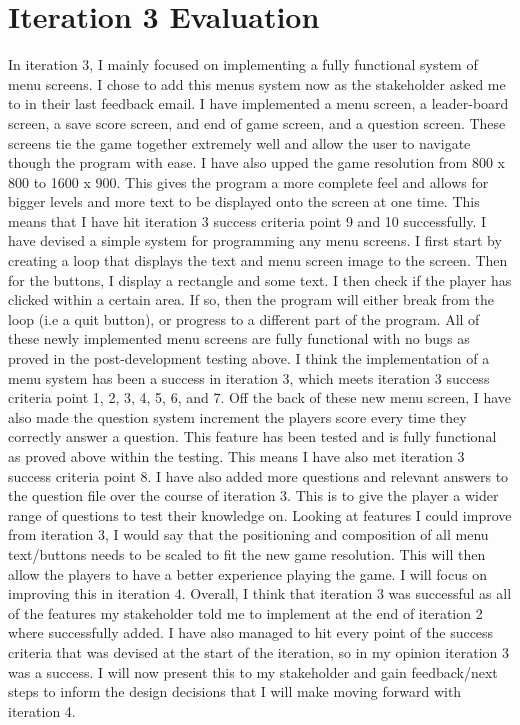 \documentclass[12pt]{report}
\begin{document}
\section{Iteration 3 Evaluation}
In iteration 3, I mainly focused on implementing a fully functional system of menu screens. I chose to add this menus system now as the stakeholder asked me to in their last feedback email. I have implemented a menu screen, a leader-board screen, a save score screen, and end of game screen, and a question screen. These screens tie the game together extremely well and allow the user to navigate though the program with ease. I have also upped the game resolution from 800 x 800 to 1600 x 900. This gives the program a more complete feel and allows for bigger levels and more text to be displayed onto the screen at one time. This means that I have hit iteration 3 success criteria point 9 and 10 successfully.   
\newline
\newline
I have devised a simple system for programming any menu screens. I first start by creating a loop that displays the text and menu screen image to the screen. Then for the buttons, I display a rectangle and some text. I then check if the player has clicked within a certain area. If so, then the program will either break from the loop (i.e a quit button), or progress to a different part of the program. All of these newly implemented menu screens are fully functional with no bugs as proved in the post-development testing above. I think the implementation of a menu system has been a success in iteration 3, which meets iteration 3 success criteria point 1, 2, 3, 4, 5, 6, and 7.
\newline
\newline
Off the back of these new menu screen, I have also made the question system increment the players score every time they correctly answer a question. This feature has been tested and is fully functional as proved above within the testing. This means I have also met iteration 3 success criteria point 8. I have also added more questions and relevant answers to the question file over the course of iteration 3. This is to give the player a wider range of questions to test their knowledge on. 
\newline
\newline
Looking at features I could improve from iteration 3, I would say that the positioning and composition of all menu text/buttons needs to be scaled to fit the new game resolution. This will then allow the players to have a better experience playing the game. I will focus on improving this in iteration 4. 
\newline
\newline
Overall, I think that iteration 3 was successful as all of the features my stakeholder told me to implement at the end of iteration 2 where successfully added. I have also managed to hit every point of the success criteria that was devised at the start of the iteration, so in my opinion iteration 3 was a success. I will now present this to my stakeholder and gain feedback/next steps to inform the design decisions that I will make moving forward with iteration 4.
\end{document}
